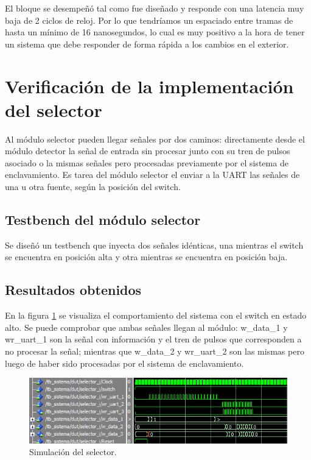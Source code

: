 	El bloque se desempeñó tal como fue diseñado y responde con una latencia muy baja de 2 ciclos de reloj. Por lo que tendríamos un espaciado entre tramas de hasta un mínimo de 16 nanosegundos, lo cual es muy positivo a la hora de tener un sistema que debe responder de forma rápida a los cambios en el exterior.	
	
\section{Verificación de la implementación del selector}

	Al módulo selector pueden llegar señales por dos caminos: directamente desde el módulo detector la señal de entrada sin procesar junto con su tren de pulsos asociado o la mismas señales pero procesadas previamente por el sistema de enclavamiento. Es tarea del módulo selector el enviar a la UART las señales de una u otra fuente, según la posición del switch.	
	
	\subsection{Testbench del módulo selector}
			
		Se diseñó un testbench que inyecta dos señales idénticas, una mientras el switch se encuentra en posición alta y otra mientras se encuentra en posición baja.		
						
	\subsection{Resultados obtenidos}
				
		En la figura \ref{fig:Test_Selector} se visualiza el comportamiento del sistema con el switch en estado alto. Se puede comprobar que ambas señales llegan al módulo: w\_data\_1 y wr\_uart\_1 son la señal con información y el tren de pulsos que corresponden a no procesar la señal; mientras que w\_data\_2 y wr\_uart\_2 son las mismas pero luego de haber sido procesadas por el sistema de enclavamiento.
			
	\begin{figure}[h]
	\centering
	\includegraphics[scale=0.9]{./Figures/Test/Selector}
		\caption{Simulación del selector.}
		\label{fig:Test_Selector}
	\end{figure}
	
